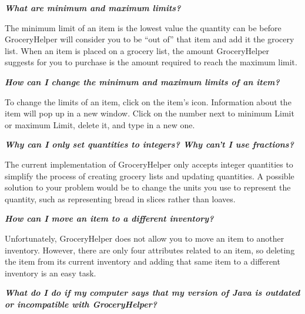 \documentclass[letterpaper,12pt]{article}
\renewenvironment{itemize}[1]{\begin{compactitem}#1}{\end{compactitem}}
\begin{document}
\begin{itemize}
\item[Q.] \textit{\textbf{What are minimum and maximum limits?}}\\

\item[A.] The minimum limit of an item is the lowest value the quantity can be before GroceryHelper will consider you to be ``out of'' that item and add it the grocery list. When an item is placed on a grocery list, the amount GroceryHelper suggests for you to purchase is the amount required to reach the maximum limit.\\

\item[Q.] \textit{\textbf{How can I change the minimum and maximum limits of an item?}}\\

	\item[A.] To change the limits of an item, click on the item's icon. Information about the item will pop up in a new window. Click on the number next to minimum Limit or maximum Limit, delete it, and type in a new one.\\

\item[Q.] \textit{\textbf{Why can I only set quantities to integers? Why can't I use fractions?}}\\

	\item[A.] The current implementation of GroceryHelper only accepts integer quantities to simplify the process of creating grocery lists and updating quantities. A possible solution to your problem would be to change the units you use to represent the quantity, such as representing bread in slices rather than loaves. \\

\item[Q.] \textit{\textbf{How can I move an item to a different inventory?}}\\

\item[A.] Unfortunately, GroceryHelper does not allow you to move an item to another inventory. However, there are only four attributes related to an item, so deleting the item from its current inventory and adding that same item to a different inventory is an easy task.\\

\item [Q.] \textit{\textbf{What do I do if my computer says that my version of Java is outdated or incompatible with GroceryHelper?}}\\


\end{itemize}
\end{document}

